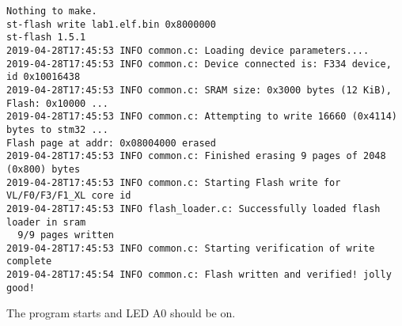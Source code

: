 \documentclass[11pt]{report}
\begin{document}
\begin{shaded*}
\scriptsize
\vspace{-1.7mm}
\begin{verbatim}
Nothing to make.
st-flash write lab1.elf.bin 0x8000000
st-flash 1.5.1
2019-04-28T17:45:53 INFO common.c: Loading device parameters....
2019-04-28T17:45:53 INFO common.c: Device connected is: F334 device, id 0x10016438
2019-04-28T17:45:53 INFO common.c: SRAM size: 0x3000 bytes (12 KiB), Flash: 0x10000 ...
2019-04-28T17:45:53 INFO common.c: Attempting to write 16660 (0x4114) bytes to stm32 ...
Flash page at addr: 0x08004000 erased
2019-04-28T17:45:53 INFO common.c: Finished erasing 9 pages of 2048 (0x800) bytes
2019-04-28T17:45:53 INFO common.c: Starting Flash write for VL/F0/F3/F1_XL core id
2019-04-28T17:45:53 INFO flash_loader.c: Successfully loaded flash loader in sram
  9/9 pages written
2019-04-28T17:45:53 INFO common.c: Starting verification of write complete
2019-04-28T17:45:54 INFO common.c: Flash written and verified! jolly good!
\end{verbatim}
\end{shaded*}

The program starts and LED A0 should be on.



\end{document}
